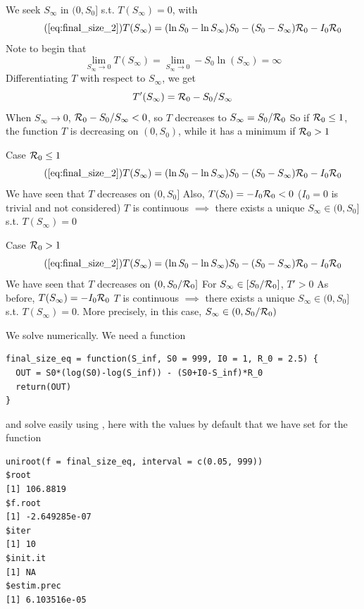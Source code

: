 \documentclass[aspectratio=43]{beamer}
\begin{document}
\begin{frame}{}
  We seek $S_\infty$ in $(0,S_0]$ s.t. $T(S_\infty)=0$, with
  \begin{equation}\tag{\ref{eq:final_size_2}}
    T(S_\infty) =(\ln S_0-\ln S_\infty)S_0
    - (S_0-S_\infty)\R_0 -I_0\R_0      
  \end{equation}
  \vfill
  Note to begin that 
  $$
  \lim_{S_\infty\to 0}T(S_\infty)=\lim_{S_\infty\to 0}-S_0\ln(S_\infty)=\infty
  $$
  \vfill
  Differentiating $T$ with respect to $S_\infty$, we get 
  $$
  T'(S_\infty)=\mathcal{R}_0-S_0/S_\infty
  $$ 
  \vfill
  When $S_\infty\to 0$, $\mathcal{R}_0-S_0/S_\infty<0$, so $T$ decreases to $S_\infty=S_0/\mathcal{R}_0$
  \vfill
  So if $\mathcal{R}_0\leq 1$, the function $T$ is decreasing on $(0,S_0)$, while it has a minimum if $\mathcal{R}_0>1$
\end{frame}



\begin{frame}{Case $\mathcal{R}_0\leq 1$}
  \begin{equation}\tag{\ref{eq:final_size_2}}
    T(S_\infty) =(\ln S_0-\ln S_\infty)S_0
    - (S_0-S_\infty)\R_0 -I_0\R_0      
  \end{equation}
  \vfill
  \bbullet We have seen that $T$ decreases on $(0,S_0]$
  \vfill
  \bbullet Also, $T(S_0)=-I_0\mathcal{R}_0<0$ ($I_0=0$ is trivial and not considered)
  \vfill
  \bbullet $T$ is continuous
  \vfill
  $\implies$ there exists a unique $S_\infty\in (0,S_0]$ s.t. $T(S_\infty)=0$
\end{frame}


\begin{frame}{Case $\mathcal{R}_0> 1$}
  \begin{equation}\tag{\ref{eq:final_size_2}}
    T(S_\infty) =(\ln S_0-\ln S_\infty)S_0
    - (S_0-S_\infty)\R_0 -I_0\R_0      
  \end{equation}
  \vfill
  \bbullet We have seen that $T$ decreases on $(0,S_0/\mathcal{R}_0]$
  \vfill
  \bbullet For $S_\infty\in[S_0/\mathcal{R}_0]$, $T'>0$
  \vfill
  \bbullet As before, $T(S_\infty)=-I_0\mathcal{R}_0$
  \vfill
  \bbullet $T$ is continuous
  \vfill
  $\implies$ there exists a unique $S_\infty\in (0,S_0]$ s.t. $T(S_\infty)=0$. More precisely, in this case, $S_\infty\in(0,S_0/\mathcal{R}_0)$
\end{frame}



\begin{frame}[fragile]{}
We solve numerically. We need a function
\begin{lstlisting}  
final_size_eq = function(S_inf, S0 = 999, I0 = 1, R_0 = 2.5) {
  OUT = S0*(log(S0)-log(S_inf)) - (S0+I0-S_inf)*R_0
  return(OUT)
}
\end{lstlisting}
and solve easily using , here with the values by default that we have set for the function
\begin{lstlisting}
uniroot(f = final_size_eq, interval = c(0.05, 999))
$root
[1] 106.8819
$f.root
[1] -2.649285e-07
$iter
[1] 10
$init.it
[1] NA
$estim.prec
[1] 6.103516e-05
\end{lstlisting}
\end{frame}
\end{document}
